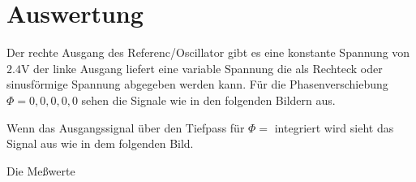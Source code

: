 \section{Auswertung}
\label{sec:Auswertung}
Der rechte Ausgang des Referenc/Oscillator gibt es eine konstante Spannung
von $2.4\si{\volt}$ der linke Ausgang liefert eine variable Spannung die
als Rechteck oder sinusförmige Spannung abgegeben werden kann. Für die
Phasenverschiebung $\Phi=0,0,0,0,0$ sehen die Signale wie in den folgenden
Bildern aus.
\begin{figure}
\end{figure}
Wenn das Ausgangssignal über den Tiefpass für $\Phi=$ integriert wird sieht das
Signal aus wie in dem folgenden Bild.
\begin{figure}
\end{figure}
Die Meßwerte 
